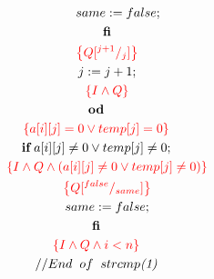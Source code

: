 \documentclass [a4paper, 12pt, fleqn]  {article}
\newcommand{\assn}[1]{{\color{red}\left\{#1\right\}}}
\begin{document}
\begin{gather*}
\hspace{0.6cm} \hspace{1.2cm} same \Ass false; \\
\hspace{0.6cm} \hspace{0.6cm} \FI \\
\hspace{0.6cm} \hspace{0.6cm} \assn{ Q \subst {j + 1} j  } \\
\hspace{0.6cm} \hspace{0.6cm} j \Ass j + 1; \\
\hspace{0.6cm} \hspace{0.6cm} \assn {I \AND Q} \\
\hspace{0.6cm} \OD \\
\hspace{0.6cm} \assn{  a[i][j] = 0 \OR temp[j] = 0   } \\
\hspace{0.6cm} \IF \hspace{0.1cm} a[i][j] \neq 0 \OR temp[j] \neq 0; \\
\hspace{0.6cm} \hspace{0.6cm} \assn{  I \AND Q \AND (a[i][j] \neq 0 \OR temp[j] \neq 0)  } \\
\hspace{0.6cm} \hspace{0.6cm} \assn{ Q \subst {false} {same} } \\
\hspace{0.6cm} \hspace{0.6cm} same \Ass false; \\
\hspace{0.6cm} \FI \\
\hspace{0.6cm} \assn{ I \AND Q \AND i < n  } \\
\hspace{0.6cm} // End \hspace{0.2cm} of \hspace{0.2cm} strcmp \textit{(1)} \\ %
\end{gather*}
\end{document}
